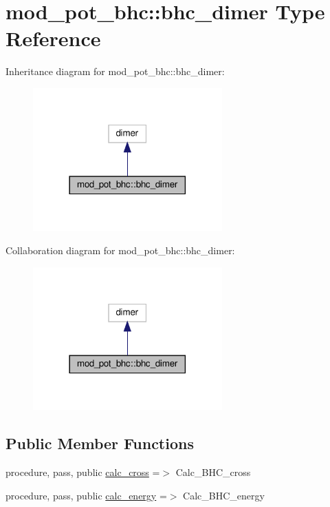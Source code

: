 \hypertarget{structmod__pot__bhc_1_1bhc__dimer}{}\section{mod\+\_\+pot\+\_\+bhc\+:\+:bhc\+\_\+dimer Type Reference}
\label{structmod__pot__bhc_1_1bhc__dimer}


Inheritance diagram for mod\+\_\+pot\+\_\+bhc\+:\+:bhc\+\_\+dimer\+:
\nopagebreak
\begin{figure}[H]
\begin{center}
\leavevmode
\includegraphics[width=206pt]{structmod__pot__bhc_1_1bhc__dimer__inherit__graph}
\end{center}
\end{figure}


Collaboration diagram for mod\+\_\+pot\+\_\+bhc\+:\+:bhc\+\_\+dimer\+:
\nopagebreak
\begin{figure}[H]
\begin{center}
\leavevmode
\includegraphics[width=206pt]{structmod__pot__bhc_1_1bhc__dimer__coll__graph}
\end{center}
\end{figure}
\subsection*{Public Member Functions}
\begin{DoxyCompactItemize}
\item 
procedure, pass, public \hyperlink{structmod__pot__bhc_1_1bhc__dimer_a15f64c6d9173bc73fe8f651ce3da811b}{calc\+\_\+cross} =$>$ Calc\+\_\+\+B\+H\+C\+\_\+cross
\item 
procedure, pass, public \hyperlink{structmod__pot__bhc_1_1bhc__dimer_a2e7a5592d05db91d843ba8b60000103e}{calc\+\_\+energy} =$>$ Calc\+\_\+\+B\+H\+C\+\_\+energy
\end{DoxyCompactItemize}
